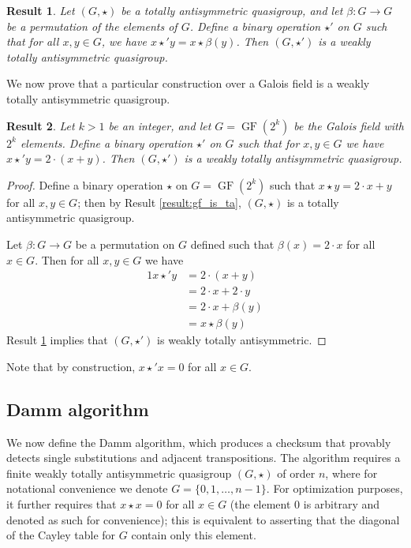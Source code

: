 \documentclass{article}
\theoremstyle{plain}
\newtheorem{result}{Result}[section]
\theoremstyle{definition}
\newcommand{\GF}{\operatorname{GF}}
\begin{document}
\begin{result}
	\label{result:permute_wta}
	Let $(G,\star)$ be a totally antisymmetric quasigroup, and let $\beta: G \to G$ be a permutation of the elements of $G$.
	Define a binary operation $\star'$ on $G$ such that for all $x,y \in G$, we have $x \star' y = x \star \beta(y)$.
	Then $(G,\star')$ is a weakly totally antisymmetric quasigroup.
\end{result}

We now prove that a particular construction over a Galois field is a weakly totally antisymmetric quasigroup.

\begin{result}
	\label{result:wta}
	Let $k > 1$ be an integer, and let $G = \GF(2^k)$ be the Galois field with $2^k$ elements.
	Define a binary operation $\star'$ on $G$ such that for $x,y \in G$ we have $x \star' y = 2 \cdot (x + y)$.
	Then $(G,\star')$ is a weakly totally antisymmetric quasigroup.
\end{result}

\begin{proof}
	Define a binary operation $\star$ on $G = \GF(2^k)$ such that $x \star y = 2 \cdot x + y$ for all $x,y \in G$; then by Result \ref{result:gf_is_ta}, $(G,\star)$ is a totally antisymmetric quasigroup.

	Let $\beta: G \to G$ be a permutation on $G$ defined such that $\beta(x) = 2 \cdot x$ for all $x \in G$.
	Then for all $x,y \in G$ we have
	\begin{alignat*}{1}
		x \star' y &= 2 \cdot (x + y) \\
		&= 2 \cdot x + 2 \cdot y \\
		&= 2 \cdot x + \beta(y) \\
		&= x \star \beta(y)
	\end{alignat*}
	Result \ref{result:permute_wta} implies that $(G,\star')$ is weakly totally antisymmetric.
\end{proof}
Note that by construction, $x \star' x = 0$ for all $x \in G$.

\subsection{Damm algorithm}

We now define the Damm algorithm, which produces a checksum that provably detects single substitutions and adjacent transpositions.
The algorithm requires a finite weakly totally antisymmetric quasigroup $(G,\star)$ of order $n$, where for notational convenience we denote $G = \{0,1,\ldots,n-1\}$.
For optimization purposes, it further requires that $x \star x = 0$ for all $x \in G$ (the element $0$ is arbitrary and denoted as such for convenience); this is equivalent to asserting that the diagonal of the Cayley table for $G$ contain only this element.
\end{document}
